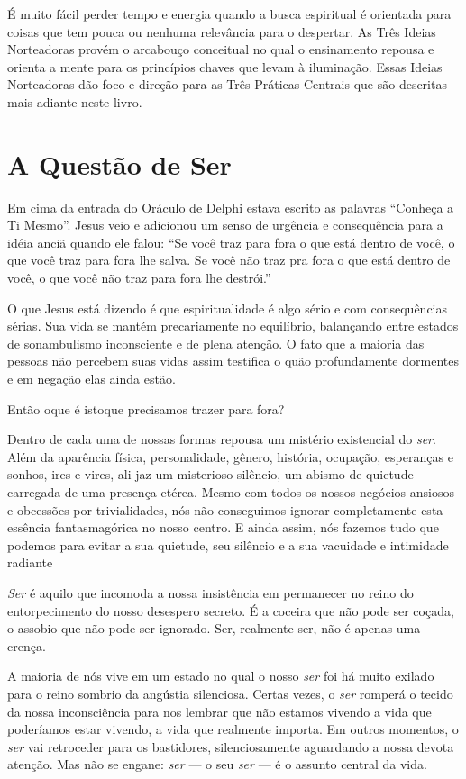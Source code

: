 É muito fácil perder tempo e energia quando a busca espiritual é orientada para coisas que tem pouca ou nenhuma relevância para o despertar. As Três Ideias Norteadoras provém o arcabouço conceitual no qual o ensinamento repousa e orienta a mente para os princípios chaves que levam à iluminação. Essas Ideias Norteadoras dão foco e direção para as Três Práticas Centrais que são descritas mais adiante neste livro.

\section*{A Questão de Ser}

Em cima da entrada do Oráculo de Delphi estava escrito as palavras ``Conheça a Ti Mesmo''. Jesus veio e adicionou um senso de urgência e consequência para a idéia anciã quando ele falou: ``Se você traz para fora o que está dentro de você, o que você traz para fora lhe salva. Se você não traz pra fora o que está dentro de você, o que você não traz para fora lhe destrói.''

O que Jesus está dizendo é que espiritualidade é algo sério e com consequências sérias. Sua vida se mantém precariamente no equilíbrio, balançando entre estados de sonambulismo inconsciente e de plena atenção. O fato que a maioria das pessoas não percebem suas vidas assim testifica o quão profundamente dormentes e em negação elas ainda estão.

Então oque é istoque precisamos trazer para fora?

Dentro de cada uma de nossas formas repousa um mistério existencial do \emph{ser}. Além da aparência física, personalidade, gênero, história, ocupação, esperanças e sonhos, ires e vires, ali jaz um misterioso silêncio, um abismo de quietude carregada de uma presença etérea. Mesmo com todos os nossos negócios ansiosos e obcessões por trivialidades, nós não conseguimos ignorar completamente esta essência fantasmagórica no nosso centro. E ainda assim, nós fazemos tudo que podemos para evitar a sua quietude, seu silêncio e a sua vacuidade e intimidade radiante

\emph{Ser} é aquilo que incomoda a nossa insistência em permanecer no reino do entorpecimento do nosso desespero secreto. É a coceira que não pode ser coçada, o assobio que não pode ser ignorado. Ser, realmente ser, não é apenas uma crença.

A maioria de nós vive em um estado no qual o nosso \emph{ser} foi há muito exilado para o reino sombrio da angústia silenciosa. Certas vezes, o \emph{ser} romperá o tecido da nossa inconsciência para nos lembrar que não estamos vivendo a vida que poderíamos estar vivendo, a vida que realmente importa. Em outros momentos, o \emph{ser} vai retroceder para os bastidores, silenciosamente aguardando a nossa devota atenção. Mas não se engane: \emph{ser} --- o seu \emph{ser} --- é o assunto central da vida. 

